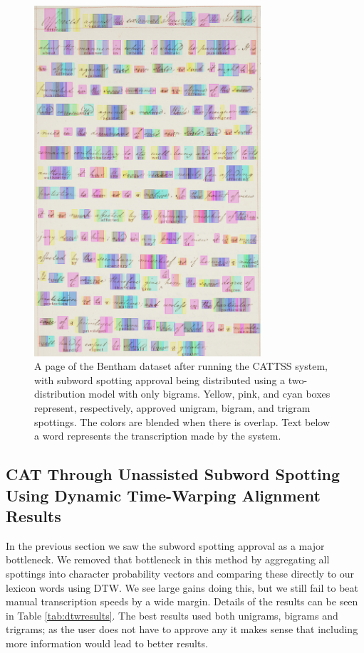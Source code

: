 \documentclass[ms,electronic,twosidetoc,letterpaper,chaptercenter,parttop,lof,lot]{byumsphd}
\begin{document}
\begin{figure}
    \centering
    \includegraphics[width=0.75\textwidth]{aftercattss}
    \caption{A page of the Bentham dataset after running the CATTSS system, with subword spotting approval being distributed using a two-distribution model with only bigrams. Yellow, pink, and cyan boxes represent, respectively, approved unigram, bigram, and trigram spottings. The colors are blended when there is overlap. Text below a word represents the transcription made by the system.}
    \label{fig:aftercattss}
\end{figure}




\subsection{CAT Through Unassisted Subword Spotting Using Dynamic Time-Warping Alignment Results}

In the previous section we saw the subword spotting approval as a major bottleneck. We removed that bottleneck in this method by aggregating all spottings into character probability vectors and comparing these directly to our lexicon words using DTW. We see large gains doing this, but we still fail to beat manual transcription speeds by a wide margin. Details of the results can be seen in Table \ref{tab:dtwresults}. The best results used both unigrams, bigrams and trigrams; as the user does not have to approve any it makes sense that including more information would lead to better results.
\end{document}

